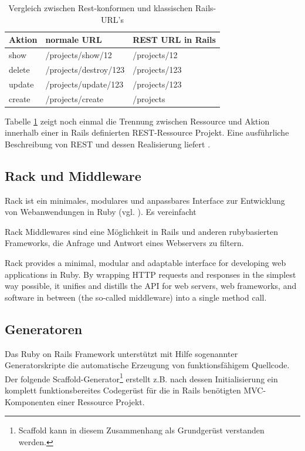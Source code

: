 \begin{table}[!h]
\caption{Vergleich zwischen Rest-konformen und klassischen Rails-URL's}
\label{tab.restnonrest}
\center
\begin{tabular}[!ht]{|l|l|l|}
\hline
Aktion & normale URL & 	REST URL in Rails \\
\hline
show &	/projects/show/12 &	/projects/12 \\
\hline
delete & /projects/destroy/123 & /projects/123 \\
\hline
update & /projects/update/123 &	/projects/123 \\
\hline
create & /projects/create & /projects \\
\hline
\end{tabular}
\end{table}

Tabelle \ref{tab.restnonrest} zeigt noch einmal die Trennung zwischen Ressource und Aktion innerhalb einer in Rails definierten REST-Ressource Projekt. Eine ausführliche Beschreibung von REST und dessen Realisierung liefert \cite{Wirdemann08}.

\subsection{Rack und Middleware}
Rack ist ein minimales, modulares und anpassbares Interface zur Entwicklung von Webanwendungen in Ruby (vgl. ). Es vereinfacht


Rack Middlewares sind eine Möglichkeit in Rails und anderen rubybasierten Frameworks, die Anfrage und Antwort eines Webservers zu filtern.



Rack provides a minimal, modular and adaptable interface for developing web applications in Ruby. By wrapping HTTP requests and responses in the simplest way possible, it unifies and distills the API for web servers, web frameworks, and software in between (the so-called middleware) into a single method call.
\subsection{Generatoren}
Das Ruby on Rails Framework unterstützt mit Hilfe sogenannter Generatorskripte die automatische Erzeugung von funktionsfähigem Quellcode. Der folgende Scaffold-Generator\footnote{Scaffold kann in diesem Zusammenhang als Grundgerüst verstanden werden.} erstellt z.B. nach dessen Initialisierung ein komplett funktionsbereites Codegerüst für die in Rails benötigten MVC-Komponenten einer Ressource Projekt.


